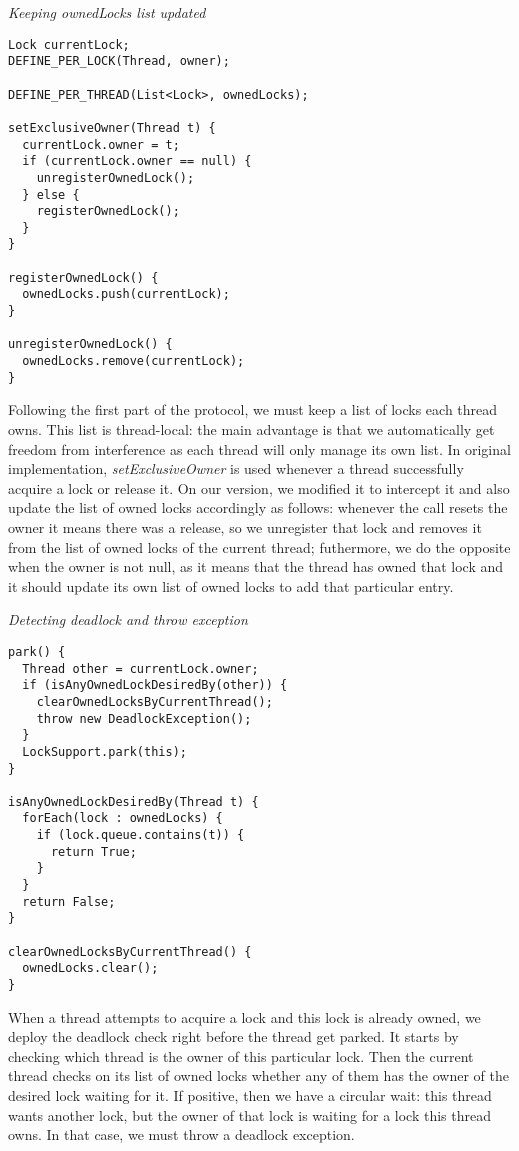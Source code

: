 \medskip
\noindent
{\it Keeping ownedLocks list updated}
\begin{verbatim}
Lock currentLock;
DEFINE_PER_LOCK(Thread, owner);

DEFINE_PER_THREAD(List<Lock>, ownedLocks);

setExclusiveOwner(Thread t) {
  currentLock.owner = t;
  if (currentLock.owner == null) {
    unregisterOwnedLock();
  } else {
    registerOwnedLock();
  }
}

registerOwnedLock() {
  ownedLocks.push(currentLock);
}

unregisterOwnedLock() {
  ownedLocks.remove(currentLock);
}
\end{verbatim}

Following the first part of the protocol, we must keep a list of locks each thread owns.
This list is thread-local: the main advantage is that we automatically get freedom from interference as each thread will only manage its own list.
In original implementation, \emph{setExclusiveOwner} is used whenever a thread successfully acquire a lock or release it.
On our version, we modified it to intercept it and also update the list of owned locks accordingly as follows:
whenever the call resets the owner it means there was a release, so we unregister that lock and removes it from the list of owned locks of the current thread;
futhermore, we do the opposite when the owner is not null, as it means that the thread has owned that lock and it should update its own list of owned locks to add that particular entry.

\medskip
\noindent
{\it Detecting deadlock and throw exception}
\begin{verbatim}
park() {
  Thread other = currentLock.owner;
  if (isAnyOwnedLockDesiredBy(other)) {
    clearOwnedLocksByCurrentThread();
    throw new DeadlockException();
  }
  LockSupport.park(this);
}

isAnyOwnedLockDesiredBy(Thread t) {
  forEach(lock : ownedLocks) {
    if (lock.queue.contains(t)) {
      return True;
    }
  }
  return False;
}

clearOwnedLocksByCurrentThread() {
  ownedLocks.clear();
}
\end{verbatim}

When a thread attempts to acquire a lock and this lock is already owned, we deploy the deadlock check right before the thread get parked.
It starts by checking which thread is the owner of this particular lock.
Then the current thread checks on its list of owned locks whether any of them has the owner of the desired lock waiting for it.
If positive, then we have a circular wait: this thread wants another lock, but the owner of that lock is waiting for a lock this thread owns.
In that case, we must throw a deadlock exception.

